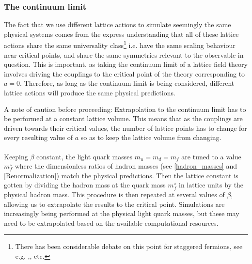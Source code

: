 \documentclass[a4paper,10pt]{article}
\begin{document}
\subsubsection{The continuum limit}
The fact that we use different lattice actions to simulate seemingly the same physical systems comes from the express understanding that all of these lattice actions share the same universality class\footnote{There has been considerable debate on this point for staggered fermions, see e.g. \cite{BERNARD2007235},\cite{golterman2008qcd},\cite{Creutz2007ReplyT} etc.} i.e. have the same scaling behaviour near critical points, and share the same symmetries relevant to the observable in question. This is important, as taking the continuum limit of a lattice field theory involves driving the couplings to the critical point of the theory corresponding to $a=0$. Therefore, as long as the continuum limit is being considered, different lattice actions will produce the same physical predictions.\par A note of caution before proceeding: Extrapolation to the continuum limit has to be performed at a constant lattice volume. This means that as the couplings are driven towards their critical values, the number of lattice points has to change for every resulting value of $a$ so as to keep the lattice volume from changing.\\\\Keeping $\beta$ constant, the light quark masses $m_u=m_d=m_f$ are tuned to a value $m_f^\star$ where the dimensionless ratios of hadron masses (see \ref{hadron_masses} and \ref{Renormalization}) match the physical predictions. Then the lattice constant is gotten by dividing the hadron mass at the quark mass $m_f^\star$ in lattice units by the physical hadron mass. This procedure is then repeated at several values of $\beta$, allowing us to extrapolate the results to the critical point. Simulations are increasingly being performed at the physical light quark masses, but these may need to be extrapolated based on the available computational resources.
\end{document}
